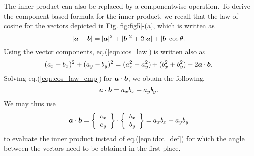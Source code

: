 \documentclass[10pt,a4j]{article}
\begin{document}
The inner product can also be replaced by a componentwise operation. To derive the component-based formula for the inner product, we recall that the law of cosine for the vectors depicted in Fig.\ref{fig:fig5}-(a), which is written as 
\begin{equation}
    \left| \mbox{\boldmath $a$}-\mbox{\boldmath $b$}\right|= 
    |\mbox{\boldmath $a$}|^2+|\mbox{\boldmath $b$}|^2
    +
    2|\mbox{\boldmath $a$}|+|\mbox{\boldmath $b$}| \cos\theta
    .
    \label{eqn:cos_law}
\end{equation}
Using the vector components, eq.(\ref{eqn:cos_law}) is written also as 
\begin{equation}
    (a_x-b_x)^2+(a_y-b_y)^2
    =
    (a_x^2+a_y^2)+(b_x^2+b_y^2) -2\mbox{\boldmath $a$}\cdot\mbox{\boldmath $b$}.
    \label{eqn:cos_law_cmp}
\end{equation}
Solving eq.(\ref{eqn:cos_law_cmp}) for $\mbox{\boldmath $a$}\cdot\mbox{\boldmath $b$}$, we obtain the following. 
\begin{equation}
    \mbox{\boldmath $a$}\cdot\mbox{\boldmath $b$}=a_xb_x+a_yb_y.
    \label{eqn:}
\end{equation}
We may thus use 
\begin{equation}
    \mbox{\boldmath $a$} \cdot \mbox{\boldmath $b$}
    =
    \left\{
        \begin{array}{c}
            a_x \\
            a_y 
        \end{array}
    \right\}
    \cdot
    \left\{
        \begin{array}{c}
            b_x \\
            b_y 
        \end{array}
    \right\}
    = a_xb_x+a_yb_y
    \label{eqn:}
\end{equation}
to evaluate the inner product instead of eq.(\ref{eqn:idot_def}) for which the angle between the vectors need to be obtained in the first place. 
\end{document}
